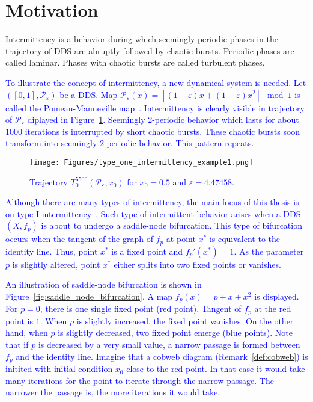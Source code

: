 \section{Motivation}
Intermittency is a behavior during which seemingly periodic phases in the trajectory of DDS are abruptly followed by chaotic bursts.
Periodic phases are called laminar.
Phases with chaotic bursts are called turbulent phases.
\par
\textcolor{blue}{
To illustrate the concept of intermittency, a new dynamical system is needed.
Let $([0, 1], \mathcal{P}_{\varepsilon})$ be a DDS.
Map $\mathcal{P}_{\varepsilon}(x) = \left[ (1+\varepsilon)x+(1-\varepsilon)x^2 \right] \mod{1}$ is called the Pomeau-Manneville map~\cite{Manneville1980,Datseris2022}.
Intermittency is clearly visible in trajectory of $\mathcal{P}_{\varepsilon}$ diplayed in Figure~\ref{fig:intermittent_trajectory_example}.
Seemingly 2-periodic behavior which lasts for about 1000 iterations is interrupted by short chaotic bursts.
These chaotic bursts soon transform into seemingly 2-periodic behavior.
This pattern repeats.
}

\begin{figure}[!h]
    \centering
    \texttt{[image: Figures/type\_one\_intermittency\_example1.png]}
    \caption{
        \textcolor{blue}{
        Trajectory $T^{5500}_{0}(\mathcal{P}_{\varepsilon}, x_0)$ for $x_0 = 0.5$ and $\varepsilon = 4.47458$.
        }
    }
    \label{fig:intermittent_trajectory_example}
\end{figure}

\textcolor{blue}{
Although there are many types of intermittency, the main focus of this thesis is on type-I intermittency~\cite{Pomeau1980,Bussac1982,DelRio2014}.
Such type of intermittent behavior arises when a DDS $(X, f_{p})$ is about to undergo a saddle-node bifurcation.
This type of bifurcation occurs when the tangent of the graph of $f_{p}$ at point $x^{*}$ is equivalent to the identity line.
Thus, point $x^{*}$ is a fixed point and $f_{p}'(x^{*}) = 1$.
As the parameter $p$ is slightly altered, point $x^{*}$ either splits into two fixed points or vanishes.
}
\par
\textcolor{blue}{
An illustration of saddle-node bifurcation is shown in Figure~\ref{fig:saddle_node_bifurcation}.
A map $f_{p}(x) = p + x + x^2$ is displayed.
For $p = 0$, there is one single fixed point (red point).
Tangent of $f_{p}$ at the red point is $1$.
When $p$ is slightly increased, the fixed point vanishes.
On the other hand, when $p$ is slightly decreased, two fixed point emerge (blue points).
Note that if $p$ is decreased by a very small value, a narrow passage is formed between $f_{p}$ and the identity line.
Imagine that a cobweb diagram (Remark~\ref{def:cobweb}) is initited with initial condition $x_0$ close to the red point.
In that case it would take many iterations for the point to iterate through the narrow passage.
The narrower the passage is, the more iterations it would take.
}

